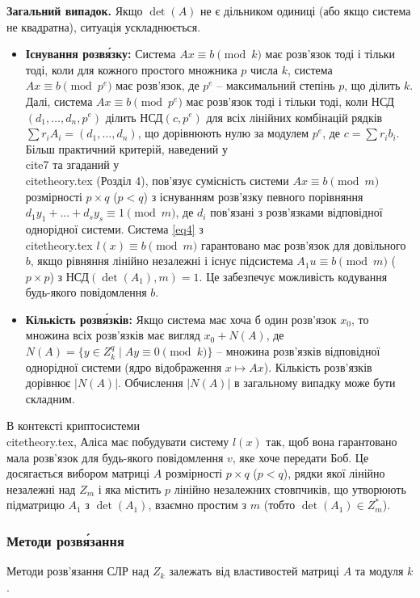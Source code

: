 \documentclass[a4paper,12pt]{article}
\begin{document}
    \textbf{Загальний випадок.} Якщо \(\det(A)\) не є дільником одиниці (або якщо система не квадратна), ситуація ускладнюється.
    \begin{itemize}
        \item \textbf{Існування розв\'язку:} Система \(Ax \equiv b \pmod k\) має розв'язок тоді і тільки тоді, коли для кожного простого множника \(p\) числа \(k\), система \(Ax \equiv b \pmod {p^e}\) має розв'язок, де \(p^e\) -- максимальний степінь \(p\), що ділить \(k\). Далі, система \(Ax \equiv b \pmod {p^e}\) має розв'язок тоді і тільки тоді, коли НСД\( (d_1, \ldots, d_n, p^e) \) ділить НСД\( (c, p^e) \) для всіх лінійних комбінацій рядків \(\sum r_i A_i = (d_1, \ldots, d_n)\), що дорівнюють нулю за модулем \(p^e\), де \(c = \sum r_i b_i\). Більш практичний критерій, наведений у \\cite{7} та згаданий у \\cite{theory.tex} (Розділ 4), пов'язує сумісність системи \(Ax \equiv b \pmod m\) розмірності \(p \times q\) (\(p < q\)) з існуванням розв'язку певного порівняння \(d_1y_1+\ldots +d_sy_s\equiv 1 \pmod{m}\), де \(d_i\) пов'язані з розв'язками відповідної однорідної системи. Система \eqref{eq4} з \\cite{theory.tex} \(l(x) \equiv b \pmod m\) гарантовано має розв'язок для довільного \(b\), якщо рівняння лінійно незалежні і існує підсистема \(A_1 u \equiv b \pmod m\) (\(p \times p\)) з НСД\((\det(A_1), m) = 1\). Це забезпечує можливість кодування будь-якого повідомлення \(b\).
        \item \textbf{Кількість розв\'язків:} Якщо система має хоча б один розв'язок \(x_0\), то множина всіх розв'язків має вигляд \(x_0 + N(A)\), де \(N(A) = \{y \in Z_k^q \mid Ay \equiv 0 \pmod k\}\) -- множина розв'язків відповідної однорідної системи (ядро відображення \(x \mapsto Ax\)). Кількість розв'язків дорівнює \(|N(A)|\). Обчислення \(|N(A)|\) в загальному випадку може бути складним.
    \end{itemize}
    В контексті криптосистеми \\cite{theory.tex}, Аліса має побудувати систему \(l(x)\) так, щоб вона гарантовано мала розв'язок для будь-якого повідомлення \(v\), яке хоче передати Боб. Це досягається вибором матриці \(A\) розмірності \(p \times q\) (\(p < q\)), рядки якої лінійно незалежні над \(Z_m\) і яка містить \(p\) лінійно незалежних стовпчиків, що утворюють підматрицю \(A_1\) з \(\det(A_1)\), взаємно простим з \(m\) (тобто \(\det(A_1) \in Z_m^*\)).

    \subsubsection{Методи розв\'язання} %
    Методи розв'язання СЛР над \(Z_k\) залежать від властивостей матриці \(A\) та модуля \(k\).
\end{document}
